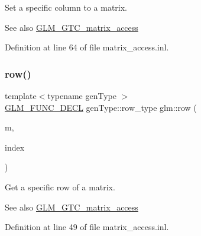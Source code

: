 Set a specific column to a matrix. \begin{DoxySeeAlso}{See also}
\hyperlink{group__gtc__matrix__access}{G\+L\+M\+\_\+\+G\+T\+C\+\_\+matrix\+\_\+access} 
\end{DoxySeeAlso}


Definition at line 64 of file matrix\+\_\+access.\+inl.

\mbox{\label{group__gtc__matrix__access_ga5b874831eef18913dbe30153e52a2476}} 
\subsubsection{\texorpdfstring{row()}{row()}\hspace{0.1cm}{\footnotesize\ttfamily [1/2]}}
{\footnotesize\ttfamily template$<$typename gen\+Type $>$ \\
\hyperlink{setup_8hpp_ab2d052de21a70539923e9bcbf6e83a51}{G\+L\+M\+\_\+\+F\+U\+N\+C\+\_\+\+D\+E\+CL} gen\+Type\+::row\+\_\+type glm\+::row (\begin{DoxyParamCaption}\item[{gen\+Type const \&}]{m,  }\item[{\hyperlink{namespaceglm_a090a0de2260835bee80e71a702492ed9}{length\+\_\+t} const \&}]{index }\end{DoxyParamCaption})}

Get a specific row of a matrix. \begin{DoxySeeAlso}{See also}
\hyperlink{group__gtc__matrix__access}{G\+L\+M\+\_\+\+G\+T\+C\+\_\+matrix\+\_\+access} 
\end{DoxySeeAlso}


Definition at line 49 of file matrix\+\_\+access.\+inl.

\mbox{\label{group__gtc__matrix__access_gacb34e8dca9cd0efdd247a65e36ed0a86}} 
